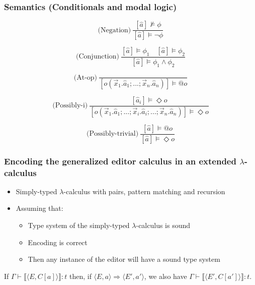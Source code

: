 \documentclass[t,24pt,aspectratio=169]{beamer}
\newcommand{\lr}[1]{\ensuremath{\langle #1 \rangle}} %
\newcommand{\ltrans}[1]{\stackrel{#1}{\Rightarrow}} %
\newcommand{\encode}[1]{\llbracket #1 \rrbracket} %
\renewcommand{\vec}[1]{\overrightarrow{#1}}
\begin{document}
\begin{frame}
    \frametitle{Semantics (Conditionals and modal logic)}
    \[
        \text{(Negation)} \ \frac{[\hat{a}] \not\models \phi}{[\hat{a}] \models \neg \phi}
    \]

    \[
        \text{(Conjunction)} \ \frac{[\hat{a}] \models \phi_1 \quad [\hat{a}] \models \phi_2}{[\hat{a}] \models \phi_1 \land \phi_2}
    \]

    \vspace{0.3cm}

    \[
        \text{(At-op)} \ \frac{}{[o(\vec{x}_1.\hat{a}_1;...;\vec{x}_n.\hat{a}_n)] \models @o}
    \]

    \[
        \text{(Possibly-i)} \ \frac{[\hat{a}_i] \models \Diamond o}{[o(\vec{x}_1.\hat{a}_1;...;\Vec{x}_i.\hat{a}_i;...;\vec{x}_n.\hat{a}_n)] \models \Diamond o}
    \]

    \[
        \text{(Possibly-trivial)} \ \frac{[\hat{a}] \models @o}{[\hat{a}] \models \Diamond o}
    \]

\end{frame}


\begin{frame}[hvid]
    \frametitle{Encoding the generalized editor calculus in an extended $\lambda$-calculus}
    \begin{itemize}
        \item Simply-typed $\lambda$-calculus with pairs, pattern matching and recursion
        \item Assuming that:
              \begin{itemize}
                  \item Type system of the simply-typed $\lambda$-calculus is sound
                  \item Encoding is correct
                  \item Then any instance of the editor will have a sound type system
              \end{itemize}
    \end{itemize}
    \begin{corollary}
  If $\Gamma \vdash \encode{\lr{E,C[a]}} : t$ then, if $\lr{E,a}
  \ltrans{} \lr{E',a'}$, we also have $\Gamma \vdash \encode{\lr{E',C[a']}} : t$.
\end{corollary}
\end{frame}
\end{document}
